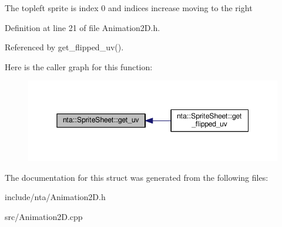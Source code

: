 The topleft sprite is index 0 and indices increase moving to the right 

Definition at line 21 of file Animation2\+D.\+h.



Referenced by get\+\_\+flipped\+\_\+uv().

Here is the caller graph for this function\+:\nopagebreak
\begin{figure}[H]
\begin{center}
\leavevmode
\includegraphics[width=345pt]{d9/d85/structnta_1_1SpriteSheet_a618bc48e6978a19ad9eb56dda3307f5a_icgraph}
\end{center}
\end{figure}


The documentation for this struct was generated from the following files\+:\begin{DoxyCompactItemize}
\item 
include/nta/Animation2\+D.\+h\item 
src/Animation2\+D.\+cpp\end{DoxyCompactItemize}

